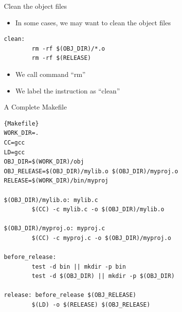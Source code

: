 \begin{frame}[fragile]{Clean the object files}
\lstset{language=[gnu] make}
\begin{itemize}
	\item {In some cases, we may want to clean the object files}
\end{itemize}
\begin{lstlisting}[linewidth=0.9\linewidth, xleftmargin=0.05\linewidth]
clean:
        rm -rf $(OBJ_DIR)/*.o
        rm -rf $(RELEASE)
\end{lstlisting}
\vspace{-0.15in}
\begin{itemize}
	\item {We call command ``rm''}
	\item {We label the instruction as ``clean''}
\end{itemize}

\end{frame}

\begin{frame}[fragile]{A Complete Makefile}
\vspace{-0.2in}
\lstset{language=[gnu] make}
\begin{lstlisting}[linewidth=0.9\linewidth, xleftmargin=0.05\linewidth]{Makefile}
WORK_DIR=.
CC=gcc
LD=gcc
OBJ_DIR=$(WORK_DIR)/obj
OBJ_RELEASE=$(OBJ_DIR)/mylib.o $(OBJ_DIR)/myproj.o
RELEASE=$(WORK_DIR)/bin/myproj

$(OBJ_DIR)/mylib.o: mylib.c
        $(CC) -c mylib.c -o $(OBJ_DIR)/mylib.o

$(OBJ_DIR)/myproj.o: myproj.c
        $(CC) -c myproj.c -o $(OBJ_DIR)/myproj.o

before_release:
        test -d bin || mkdir -p bin
        test -d $(OBJ_DIR) || mkdir -p $(OBJ_DIR)

release: before_release $(OBJ_RELEASE)
        $(LD) -o $(RELEASE) $(OBJ_RELEASE)
\end{lstlisting}

\end{frame}

